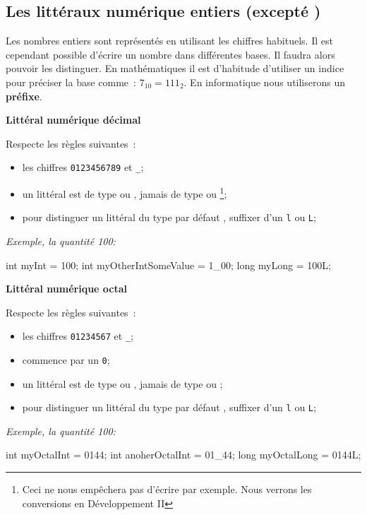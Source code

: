 \subsection{Les littéraux numérique entiers (excepté )}
\label{subsection:litterauxentiers}

Les nombres entiers sont représentés en utilisant les chiffres habituels. Il
est cependant possible d'écrire un nombre dans différentes bases. Il faudra
alors pouvoir les distinguer. En mathématiques il est d'habitude d'utiliser un
indice pour préciser la base comme : $7_{10} = 111_2$. En informatique nous
utiliserons un \textbf{préfixe}.

\textbf{Littéral numérique décimal}

Respecte les règles suivantes~:

\begin{itemize}
	\item les chiffres \texttt{0123456789} et \texttt{\_};
	\item un littéral est de type  ou , jamais de type 
		 ou \footnote{Ceci ne nous empêchera pas d'écrire 
		 par exemple. Nous verrons les conversions en 
		Développement II};
	\item pour distinguer un littéral  du type par défaut , suffixer 
		d'un \texttt{l} ou \texttt{L};
\end{itemize}

\textit{Exemple, la quantité 100: }
\begin{java}
	int myInt = 100;
	int myOtherIntSomeValue = 1_00;
	long myLong = 100L;
\end{java}

\textbf{Littéral numérique octal}

Respecte les règles suivantes~:

\begin{itemize}
	\item les chiffres \texttt{01234567} et \texttt{\_};
	\item commence par un \texttt{0};
	\item un littéral est de type  ou , jamais de type 
		 ou ;
	\item pour distinguer un littéral  du type par défaut , suffixer 
		d'un \texttt{l} ou \texttt{L};
\end{itemize}

\textit{Exemple, la quantité 100: }
\begin{java}
	int myOctalInt = 0144;
	int anoherOctalInt = 01_44;
	long myOctalLong = 0144L;
\end{java}

